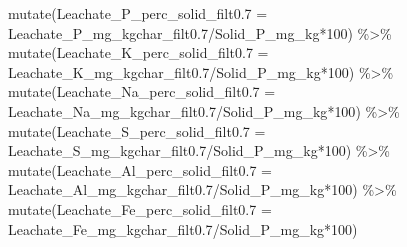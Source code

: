 \documentclass[
]{article}
\newenvironment{Shaded}{\begin{snugshade}}{\end{snugshade}}
\newcommand{\AttributeTok}[1]{\textcolor[rgb]{0.77,0.63,0.00}{#1}}
\newcommand{\DecValTok}[1]{\textcolor[rgb]{0.00,0.00,0.81}{#1}}
\newcommand{\FloatTok}[1]{\textcolor[rgb]{0.00,0.00,0.81}{#1}}
\newcommand{\FunctionTok}[1]{\textcolor[rgb]{0.00,0.00,0.00}{#1}}
\newcommand{\NormalTok}[1]{#1}
\newcommand{\SpecialCharTok}[1]{\textcolor[rgb]{0.00,0.00,0.00}{#1}}
\begin{document}
\begin{Shaded}
\begin{Highlighting}[]
  \FunctionTok{mutate}\NormalTok{(}\AttributeTok{Leachate\_P\_perc\_solid\_filt0.7 =}\NormalTok{ Leachate\_P\_mg\_kgchar\_filt0}\FloatTok{.7}\SpecialCharTok{/}\NormalTok{Solid\_P\_mg\_kg}\SpecialCharTok{*}\DecValTok{100}\NormalTok{) }\SpecialCharTok{\%\textgreater{}\%}
  \FunctionTok{mutate}\NormalTok{(}\AttributeTok{Leachate\_K\_perc\_solid\_filt0.7 =}\NormalTok{ Leachate\_K\_mg\_kgchar\_filt0}\FloatTok{.7}\SpecialCharTok{/}\NormalTok{Solid\_P\_mg\_kg}\SpecialCharTok{*}\DecValTok{100}\NormalTok{) }\SpecialCharTok{\%\textgreater{}\%}
  \FunctionTok{mutate}\NormalTok{(}\AttributeTok{Leachate\_Na\_perc\_solid\_filt0.7 =}\NormalTok{ Leachate\_Na\_mg\_kgchar\_filt0}\FloatTok{.7}\SpecialCharTok{/}\NormalTok{Solid\_P\_mg\_kg}\SpecialCharTok{*}\DecValTok{100}\NormalTok{) }\SpecialCharTok{\%\textgreater{}\%}
  \FunctionTok{mutate}\NormalTok{(}\AttributeTok{Leachate\_S\_perc\_solid\_filt0.7 =}\NormalTok{ Leachate\_S\_mg\_kgchar\_filt0}\FloatTok{.7}\SpecialCharTok{/}\NormalTok{Solid\_P\_mg\_kg}\SpecialCharTok{*}\DecValTok{100}\NormalTok{) }\SpecialCharTok{\%\textgreater{}\%}
  \FunctionTok{mutate}\NormalTok{(}\AttributeTok{Leachate\_Al\_perc\_solid\_filt0.7 =}\NormalTok{ Leachate\_Al\_mg\_kgchar\_filt0}\FloatTok{.7}\SpecialCharTok{/}\NormalTok{Solid\_P\_mg\_kg}\SpecialCharTok{*}\DecValTok{100}\NormalTok{) }\SpecialCharTok{\%\textgreater{}\%}
  \FunctionTok{mutate}\NormalTok{(}\AttributeTok{Leachate\_Fe\_perc\_solid\_filt0.7 =}\NormalTok{ Leachate\_Fe\_mg\_kgchar\_filt0}\FloatTok{.7}\SpecialCharTok{/}\NormalTok{Solid\_P\_mg\_kg}\SpecialCharTok{*}\DecValTok{100}\NormalTok{)}


\end{Highlighting}
\end{Shaded}
\end{document}
